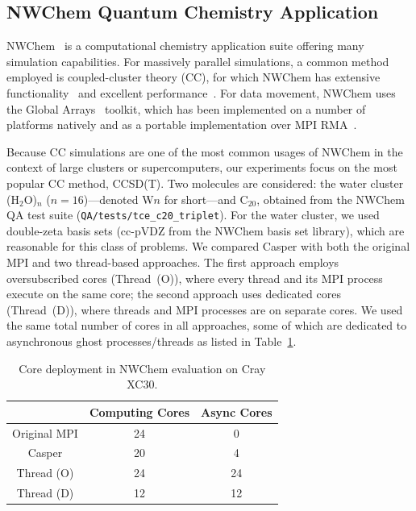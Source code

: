 

\subsection{NWChem Quantum Chemistry Application}\label{sec:eva-realapp}

NWChem~\cite{NWChem63} is a computational chemistry application suite
offering many simulation capabilities.  For massively
parallel simulations, a common method employed is coupled-cluster
theory (CC), for which NWChem has extensive
functionality~\cite{Hirata:2003:JPCA:TCE} and excellent
performance~\cite{Apra:2009:SC:NWChem}.  For data movement, NWChem uses the Global
Arrays~\cite{GA_SC94} toolkit, which has been
implemented on a number of platforms natively and as a portable
implementation over MPI RMA~\cite{dinan12:armci_mpi}.

Because CC simulations are one of the most common usages of NWChem in
the context of large clusters or supercomputers, our experiments focus
on the most popular CC method, CCSD(T).
Two molecules are considered: the water cluster (H$_2$O)$_n$
($n=16$)---denoted W$n$ for short---and C$_{20}$, obtained
from the NWChem QA test suite (\texttt{QA/tests/tce\_c20\_triplet}).
For the water cluster, we used double-zeta basis sets (cc-pVDZ from
the NWChem basis set library), which are reasonable for this class of
problems.  We compared Casper with both the original MPI and two
thread-based approaches.
The first approach employs oversubscribed cores
(Thread~(O)), where every thread and its MPI process execute on
the same core; the second approach uses dedicated cores (Thread~(D)),
where threads and MPI processes are on separate cores. We used the same total
number of cores in all approaches, some of which are dedicated to
asynchronous ghost processes\slash threads as listed in Table~\ref{tab:eva-nwcore}.

\begin{table}\scriptsize
\begin{center}
\caption{Core deployment in NWChem evaluation on Cray XC30.}\label{tab:eva-nwcore}
\begin{tabular}{|c|c|c|}
\hline
& Computing Cores & Async Cores \\
\hline
Original MPI & 24 & 0 \\
Casper & 20 & 4 \\
Thread (O) & 24 & 24 \\
Thread (D) & 12 & 12 \\
\hline
\end{tabular}
\end{center}
\end{table}

